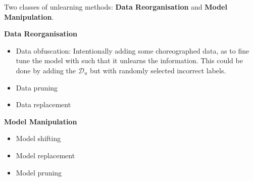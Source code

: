 Two classes of unlearning methods: \textbf{Data Reorganisation} and \textbf{Model Manipulation}.

\textbf{Data Reorganisation}
\begin{itemize}
    \item Data obfuscation: Intentionally adding some choreographed data, as to fine tune the model with such that it unlearns the information. This could be done by adding the $\mathcal{D}_u$ but with randomly selected incorrect labels.
    \item Data pruning
    \item Data replacement
\end{itemize}

\textbf{Model Manipulation}
\begin{itemize}
    \item Model shifting
    \item Model replacement 
    \item Model pruning
\end{itemize}



